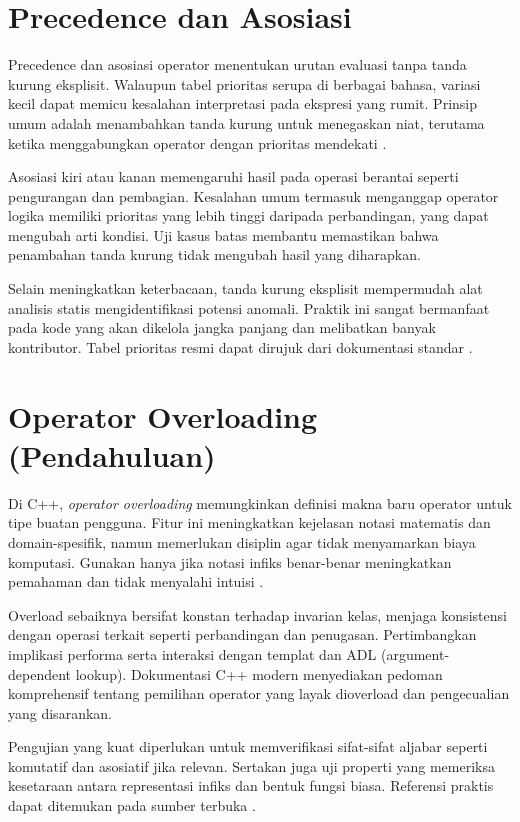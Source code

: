 \documentclass[../main.tex]{subfiles}
\begin{document}
\section{Precedence dan Asosiasi}
Precedence dan asosiasi operator menentukan urutan evaluasi tanpa tanda kurung eksplisit. Walaupun tabel prioritas serupa di berbagai bahasa, variasi kecil dapat memicu kesalahan interpretasi pada ekspresi yang rumit. Prinsip umum adalah menambahkan tanda kurung untuk menegaskan niat, terutama ketika menggabungkan operator dengan prioritas mendekati \parencite{gnu-c-manual,cpp-reference}.

Asosiasi kiri atau kanan memengaruhi hasil pada operasi berantai seperti pengurangan dan pembagian. Kesalahan umum termasuk menganggap operator logika memiliki prioritas yang lebih tinggi daripada perbandingan, yang dapat mengubah arti kondisi. Uji kasus batas membantu memastikan bahwa penambahan tanda kurung tidak mengubah hasil yang diharapkan.

Selain meningkatkan keterbacaan, tanda kurung eksplisit mempermudah alat analisis statis mengidentifikasi potensi anomali. Praktik ini sangat bermanfaat pada kode yang akan dikelola jangka panjang dan melibatkan banyak kontributor. Tabel prioritas resmi dapat dirujuk dari dokumentasi standar \parencite{gnu-c-manual,cpp-reference}.

\section{Operator Overloading (Pendahuluan)}
Di C++, \emph{operator overloading} memungkinkan definisi makna baru operator untuk tipe buatan pengguna. Fitur ini meningkatkan kejelasan notasi matematis dan domain-spesifik, namun memerlukan disiplin agar tidak menyamarkan biaya komputasi. Gunakan hanya jika notasi infiks benar-benar meningkatkan pemahaman dan tidak menyalahi intuisi \parencite{cpp-reference}.

Overload sebaiknya bersifat konstan terhadap invarian kelas, menjaga konsistensi dengan operasi terkait seperti perbandingan dan penugasan. Pertimbangkan implikasi performa serta interaksi dengan templat dan ADL (argument-dependent lookup). Dokumentasi C++ modern menyediakan pedoman komprehensif tentang pemilihan operator yang layak dioverload dan pengecualian yang disarankan.

Pengujian yang kuat diperlukan untuk memverifikasi sifat-sifat aljabar seperti komutatif dan asosiatif jika relevan. Sertakan juga uji properti yang memeriksa kesetaraan antara representasi infiks dan bentuk fungsi biasa. Referensi praktis dapat ditemukan pada sumber terbuka \parencite{cpp-reference}.
\end{document}
